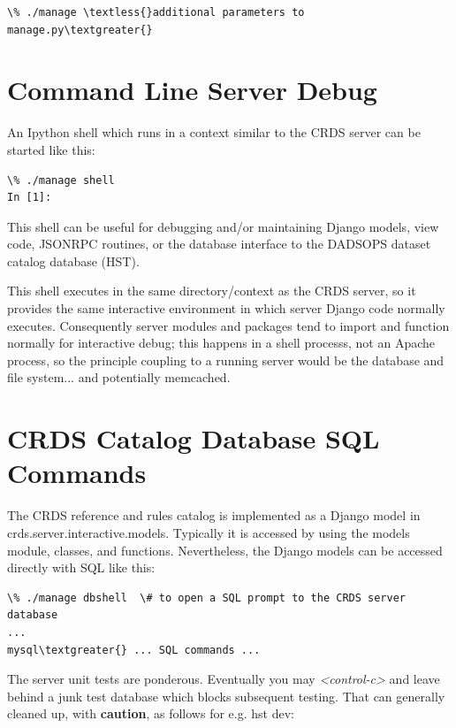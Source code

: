 \documentclass[letterpaper,10pt,english]{sphinxmanual}
\begin{document}
\begin{Verbatim}[commandchars=\\\{\}]
\% ./manage \textless{}additional parameters to manage.py\textgreater{}
\end{Verbatim}


\section{Command Line Server Debug}
\label{server_guide:command-line-server-debug}
An Ipython shell which runs in a context similar to the CRDS server can be started like this:

\begin{Verbatim}[commandchars=\\\{\}]
\% ./manage shell
In [1]:
\end{Verbatim}

This shell can be useful for debugging and/or maintaining Django models, view code, JSONRPC routines, or
the database interface to the DADSOPS dataset catalog database (HST).

This shell executes in the same directory/context as the CRDS server,  so it provides the same interactive
environment in which server Django code normally executes.   Consequently server modules and packages tend to
import and function normally for interactive debug;  this happens in a shell processs,  not an Apache process,
so the principle coupling to a running server would be the database and file system... and potentially memcached.


\section{CRDS Catalog Database SQL Commands}
\label{server_guide:crds-catalog-database-sql-commands}
The CRDS reference and rules catalog is implemented as a Django model in crds.server.interactive.models.  Typically
it is accessed by using the models module, classes, and functions.  Nevertheless,  the Django models can be accessed
directly with SQL like this:

\begin{Verbatim}[commandchars=\\\{\}]
\% ./manage dbshell  \# to open a SQL prompt to the CRDS server database
...
mysql\textgreater{} ... SQL commands ...
\end{Verbatim}

The server unit tests are ponderous.  Eventually you may \emph{\textless{}control-c\textgreater{}} and leave behind a junk test
database which blocks subsequent testing.  That can generally cleaned up,  with \textbf{caution},  as follows
for e.g. hst dev:
\end{document}
